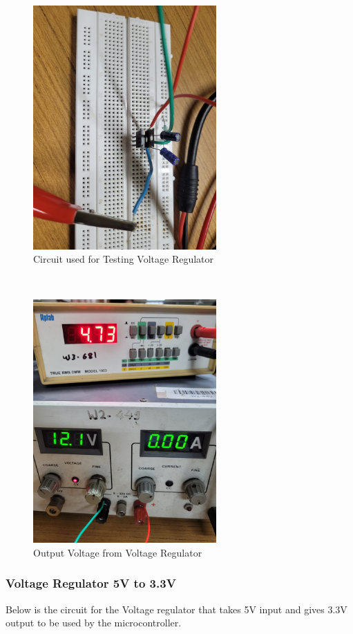 \documentclass{article}
\begin{document}
\begin{figure}[h]
    \centering
    \includegraphics[width=7cm]{Voltage_regulator2.jpeg}
    \caption{Circuit used for Testing Voltage Regulator}
    \label{fig:galaxy}
\end{figure}\\


\begin{figure}[h]
    \centering
    \includegraphics[width=7cm]{Voltage_regulator1.jpeg}
    \caption{Output Voltage from Voltage Regulator}
    \label{fig:galaxy}
\end{figure}

\subsubsection{Voltage Regulator 5V to 3.3V}
Below is the circuit for the Voltage regulator that takes 5V input and gives 3.3V output to be used by the microcontroller.
\end{document}
